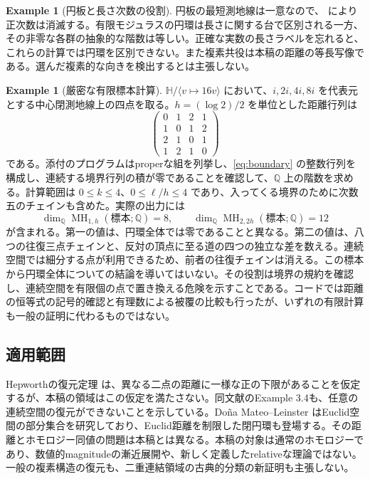 \documentclass[12pt]{amsart}
\theoremstyle{definition}
\newtheorem{eg}[thm]{Example}
\theoremstyle{remark}
\numberwithin{equation}{section}
\newcommand{\Q}{\mathbb{Q}}
\DeclareMathOperator{\MH}{MH}
\begin{document}
\begin{eg}[円板と長さ次数の役割]\label{eg:disk}
円板の最短測地線は一意なので、\cite[Corollary 5.24]{Gomi} により正次数は消滅する。有限モジュラスの円環は長さに関する台で区別される一方、その非零な各群の抽象的な階数は等しい。正確な実数の長さラベルを忘れると、これらの計算では円環を区別できない。また複素共役は本稿の距離の等長写像である。選んだ複素的な向きを検出するとは主張しない。
\end{eg}

\begin{eg}[厳密な有限標本計算]\label{eg:finite}
$\mathbb H/\langle v\mapsto16v\rangle$ において、$i,2i,4i,8i$ を代表元とする中心閉測地線上の四点を取る。$h=(\log2)/2$ を単位とした距離行列は
\[
 \begin{pmatrix}0&1&2&1\\1&0&1&2\\2&1&0&1\\1&2&1&0\end{pmatrix}
\]
である。添付のプログラムはproperな組を列挙し、\eqref{eq:boundary} の整数行列を構成し、連続する境界行列の積が零であることを確認して、$\Q$ 上の階数を求める。計算範囲は $0\le k\le4$、$0\le\ell/h\le4$ であり、入ってくる境界のために次数五のチェインも含めた。実際の出力には
\[
 \dim_{\Q}\MH_{1,h}(\text{標本};\Q)=8,\qquad
 \dim_{\Q}\MH_{2,2h}(\text{標本};\Q)=12
\]
が含まれる。第一の値は、円環全体では零であることと異なる。第二の値は、八つの往復三点チェインと、反対の頂点に至る道の四つの独立な差を数える。連続空間では細分する点が利用できるため、前者の往復チェインは消える。この標本から円環全体についての結論を導いてはいない。その役割は境界の規約を確認し、連続空間を有限個の点で置き換える危険を示すことである。コードでは距離の恒等式の記号的確認と有理数による被覆の比較も行ったが、いずれの有限計算も一般の証明に代わるものではない。
\end{eg}

\subsection*{適用範囲}
Hepworthの復元定理 \cite[Theorem 3.1]{Hepworth} は、異なる二点の距離に一様な正の下限があることを仮定するが、本稿の領域はこの仮定を満たさない。同文献のExample 3.4も、任意の連続空間の復元ができないことを示している。Do\~na Mateo--Leinster \cite{DML} はEuclid空間の部分集合を研究しており、Euclid距離を制限した閉円環も登場する。その距離とホモロジー同値の問題は本稿とは異なる。本稿の対象は通常のホモロジーであり、数値的magnitudeの漸近展開や、新しく定義したrelativeな理論ではない。一般の複素構造の復元も、二重連結領域の古典的分類の新証明も主張しない。
\end{document}
